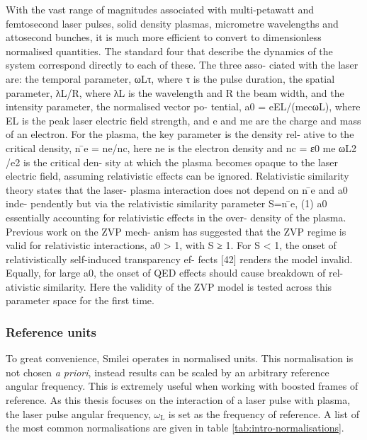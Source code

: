 With the vast range of magnitudes associated with multi-petawatt and femtosecond laser pulses, solid density plasmas, micrometre wavelengths and attosecond bunches, it is much more efficient to convert to dimensionless normalised quantities. The standard four that describe the dynamics of the system \cite{BOUCHARD THESIS??} correspond directly to each of these. The three asso- ciated with the laser are: the temporal parameter, ωLτ, where τ is the pulse duration, the spatial parameter, λL/R, where λL is the wavelength and R the beam width, and the intensity parameter, the normalised vector po- tential, a0 = eEL/(mecωL), where EL is the peak laser electric field strength, and e and me are the charge and mass of an electron.
For the plasma, the key parameter is the density rel- ative to the critical density, n ̄e = ne/nc, here ne is the electron density and nc = ε0 me ωL2 /e2 is the critical den- sity at which the plasma becomes opaque to the laser electric field, assuming relativistic effects can be ignored.
Relativistic similarity theory states that the laser- plasma interaction does not depend on n ̄e and a0 inde- pendently but via the relativistic similarity parameter
S=n ̄e, (1) a0
essentially accounting for relativistic effects in the over- density of the plasma. Previous work on the ZVP mech- anism has suggested that the ZVP regime is valid for relativistic interactions, a0 > 1, with S ≥ 1. For S < 1, the onset of relativistically self-induced transparency ef- fects [42] renders the model invalid. Equally, for large a0, the onset of QED effects should cause breakdown of rel- ativistic similarity. Here the validity of the ZVP model is tested across this parameter space for the first time.

\subsubsection{Reference units}
To great convenience, Smilei operates in normalised units. This normalisation is not chosen \textit{a priori}, instead results can be scaled by an arbitrary reference angular frequency. This is extremely useful when working with boosted frames of reference. As this thesis focuses on the interaction of a laser pulse with plasma, the laser pulse angular frequency, $\omega_\mathrm{L}$ is set as the frequency of reference. A list of the most common normalisations are given in table \ref{tab:intro-normalisations}.

